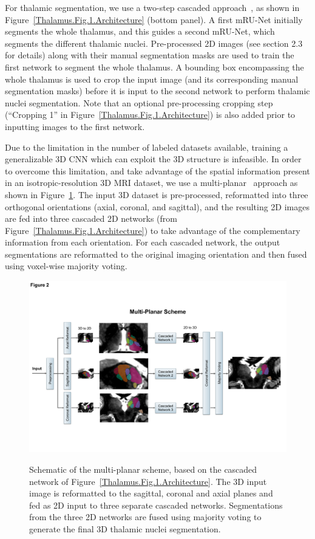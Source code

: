 For thalamic segmentation, we use a two-step cascaded approach~\cite{jia_Prostate_2017}, as shown in Figure~\ref{Thalamus.Fig.1.Architecture}  (bottom panel). A first mRU-Net initially segments the whole thalamus, and this guides a second mRU-Net, which segments the different thalamic nuclei. Pre-processed 2D images (see section 2.3 for details) along with their manual segmentation masks are used to train the first network to segment the whole thalamus. A bounding box encompassing the whole thalamus is used to crop the input image (and its corresponding manual segmentation masks) before it is input to the second network to perform thalamic nuclei segmentation. Note that an optional pre-processing cropping step (``Cropping 1'' in Figure~\ref{Thalamus.Fig.1.Architecture}) is also added prior to inputting images to the first network.

Due to the limitation in the number of labeled datasets available, training a generalizable 3D CNN which can exploit the 3D structure is infeasible. In order to overcome this limitation, and take advantage of the spatial information present in an isotropic-resolution 3D MRI dataset, we use a multi-planar~\cite{1921968:27964377} approach as shown in Figure~\ref{Thalamus.Fig.2.MultiPlanar}. The input 3D dataset is pre-processed, reformatted into three orthogonal orientations (axial, coronal, and sagittal), and the resulting 2D images are fed into three cascaded 2D networks (from Figure~\ref{Thalamus.Fig.1.Architecture}) to take advantage of the complementary information from each orientation. For each cascaded network, the output segmentations are reformatted to the original imaging orientation and then fused using voxel-wise majority voting.


\begin{figure}[!htbp]
\centering \includegraphics[width=\textwidth]{figures/pdf/slide2.pdf}\label{Thalamus.Fig.2.MultiPlanar}
\caption{{Schematic of the multi-planar scheme, based on the cascaded network of Figure~\ref{Thalamus.Fig.1.Architecture}. The 3D input image is reformatted to the sagittal, coronal and axial planes and fed as 2D input to three separate cascaded networks. Segmentations from the three 2D networks are fused using majority voting to generate the final 3D thalamic nuclei segmentation.}}
\end{figure}


